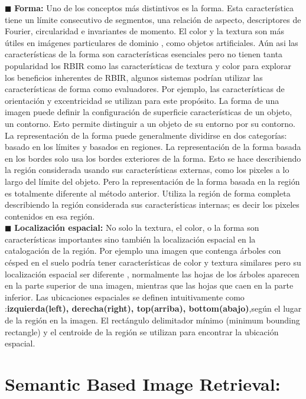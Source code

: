 \documentclass{llncs}
\begin{document}
$\blacksquare$  \textbf{Forma:}
Uno de los conceptos m\'as distintivos es la forma. Esta caracter\'istica tiene un l\'imite consecutivo de segmentos, una relaci\'on 
de aspecto, descriptores de Fourier, circularidad e invariantes de momento. El color y la textura son m\'as \'utiles en im\'agenes 
particulares de dominio , como objetos artificiales. A\'un asi las caracter\'isticas de la forma son caracter\'isticas esenciales 
pero no tienen tanta popularidad los RBIR como las caracter\'isticas de textura y color para explorar los beneficios inherentes de RBIR,
algunos sistemas podrían utilizar las características de forma como evaluadores. Por ejemplo, las características de orientación 
y excentricidad se utilizan para este propósito. La forma de una imagen puede definir la configuraci\'on de superficie  caracter\'isticas 
de un objeto, un contorno. Esto permite distinguir a un objeto de su entorno por su contorno. La representaci\'on de la forma puede 
generalmente dividirse en dos categor\'ias: basado en los l\'imites y basados en regiones. La representaci\'on de la forma basada en los 
bordes solo usa los bordes exteriores de la forma. Esto se hace describiendo la regi\'on considerada usando sus caracter\'isticas externas,
como los pixeles a lo largo del l\'imite del objeto. Pero la representaci\'on de la forma basada en la regi\'on es totalmente diferente 
al m\'etodo anterior. Utiliza la regi\'on de forma completa describiendo la regi\'on considerada sus caracter\'isticas internas; es 
decir los pixeles contenidos en esa regi\'on.
\\
$\blacksquare$  \textbf{Localizaci\'on espacial:}
No solo la textura, el color, o la forma son caracter\'isticas importantes sino tambi\'en la localizaci\'on espacial en la catalogaci\'on 
de la regi\'on. Por ejemplo una imagen que contenga \'arboles con c\'esped en el suelo podr\'ia tener caracter\'isticas de color y textura 
similares pero su localizaci\'on espacial ser diferente , normalmente las hojas de los \'arboles aparecen en la parte superior de una imagen,
mientras que las hojas que caen en la parte inferior. Las ubicaciones espaciales se definen intuitivamente como :\textbf{izquierda(left), derecha(right),
top(arriba), bottom(abajo)},seg\'un el lugar de la regi\'on en la imagen. El rect\'angulo delimitador m\'inimo (minimum bounding rectangle) y 
el centroide de la regi\'on se utilizan para encontrar la ubicaci\'on espacial.     

\section*{Semantic Based Image Retrieval:}
\end{document}
